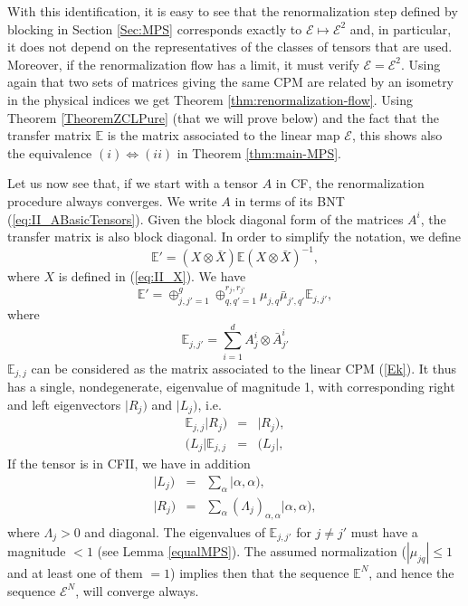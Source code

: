 \documentclass{elsarticle}
\newcommand{\be}{\begin{equation}}
\newcommand{\ee}{\end{equation}}
\newcommand{\bea}{\begin{eqnarray}}
\newcommand{\eea}{\end{eqnarray}}
\begin{document}
With this identification, it is easy to see that the renormalization step defined by blocking in Section \ref{Sec:MPS} corresponds exactly to $\mathcal{E}\mapsto \mathcal{E}^2$ and, in particular, it does not depend on the representatives of the classes of tensors that are used. Moreover, if the renormalization flow has a limit, it must verify $\mathcal{E}= \mathcal{E}^2$. Using again that two sets of matrices giving the same CPM are related by an isometry in the physical indices we get Theorem \ref{thm:renormalization-flow}. Using Theorem \ref{TheoremZCLPure} (that we will prove below) and the fact that the transfer matrix $\mathbb{E}$ is the matrix associated to the linear map $\mathcal{E}$, this shows also the equivalence $(i)\Leftrightarrow (ii)$ in Theorem  \ref{thm:main-MPS}.

Let us now see that, if we start with a tensor $A$ in CF, the renormalization procedure always converges. We write $A$ in terms of its BNT
(\ref{eq:II_ABasicTensors}). Given the block diagonal form of the matrices $A^i$, the transfer matrix is also block diagonal. In order to simplify the notation, we define
\be
    \label{eq:II_Etilde}
    \mathbb{E}' = \left(X\otimes \bar X\right) \mathbb{E}
    \left(X\otimes \bar X\right)^{-1},
\ee
where $X$ is defined in (\ref{eq:II_X}). We have
\be
    \label{EasEkk}
    \mathbb{E}'= \oplus_{j,j'=1}^g \oplus_{q,q'=1}^{r_j, r_{j'}}\mu_{j,q}{\bar\mu_{j',q'}} \mathbb{E}_{j,j'},
\ee
where
\be
    \label{Ekk}
    \mathbb{E}_{j,j'} = \sum_{i=1}^d A^i_j \otimes \bar A^i_{j'}
\ee
$\mathbb{E}_{j,j}$ can be considered as the matrix associated to the linear CPM (\ref{Ek}). It thus has a single, nondegenerate, eigenvalue of magnitude 1, with corresponding right and left eigenvectors $|R_j)$ and $|L_j)$, i.e.
\begin{subequations}
    \bea
        \mathbb{E}_{j,j} |R_j)&=&|R_j),\\
        (L_j| \mathbb{E}_{j,j} &=&(L_j|,
    \eea
\end{subequations}
If the tensor is in CFII, we have in addition
\begin{subequations}
    \bea
        \label{Lk}
        |L_j) &=& \sum_{\alpha} |\alpha,\alpha), \\
        |R_j) &=& \sum_{\alpha} (\Lambda_j)_{\alpha,\alpha} |\alpha,\alpha),
    \eea
\end{subequations}
where $\Lambda_j>0$ and diagonal. The eigenvalues of $\mathbb{E}_{j,j'}$ for $j\ne j'$ must have a magnitude $< 1$ (see Lemma \ref{equalMPS}).
The assumed normalization ($|\mu_{jq}|\le 1$ and at least one of them $=1$) implies then that the sequence $\mathbb{E}^N$, and hence the sequence $\mathcal{E}^N$, will converge always.
\end{document}
